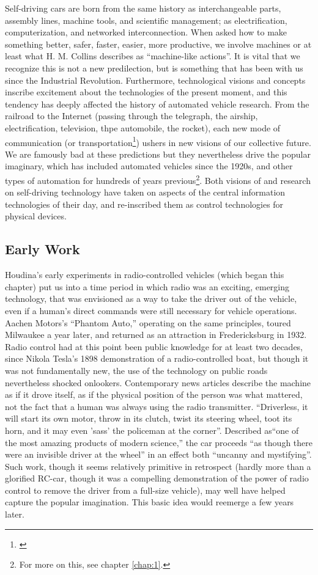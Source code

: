 Self-driving cars are born from the
same history as interchangeable parts, assembly lines, machine tools,
and scientific management; as electrification, computerization, and
networked interconnection. When asked how to make something better,
safer, faster, easier, more productive, we involve machines or at
least what H. M. Collins describes as ``machine-like actions''\cite{???}. It is
vital that we recognize this is not a new predilection, but is
something that has been with us since the Industrial Revolution.
Furthermore, technological visions and concepts inscribe excitement about the
technologies of the present moment, and this tendency has deeply
affected the history of automated vehicle research. From the railroad to the
Internet (passing through the telegraph, the airship, electrification,
television, thpe automobile, the rocket), each new mode of
communication (or transportation\footnote{\cite{???}}) ushers in new visions of our
collective future. We are famously bad at these predictions\cite{???} but they
nevertheless drive the popular imaginary, which has included automated
vehicles since the 1920s, and other types of automation for hundreds
of years previous\footnote{For more on this, see chapter
  \ref{chap:1}.}. Both visions of and research on self-driving
technology have taken on aspects of the central information
technologies of their day, and re-inscribed them as control
technologies for physical devices.

\subsection{Early Work}

Houdina's early experiments in radio-controlled vehicles (which began
this chapter) put us into a time period in which radio was an
exciting, emerging technology, that was envisioned as a way to take
the driver out of the vehicle, even if a human's direct commands were
still necessary for vehicle operations. Aachen Motors's ``Phantom
Auto,'' operating on the same principles, toured Milwaukee a year
later,\cite{???} and returned as an attraction in Fredericksburg in 1932\cite{???}.
Radio control had at this point been public knowledge for at least two
decades, since Nikola Tesla's 1898 demonstration of a radio-controlled
boat,\cite{???} but though it was not fundamentally new, the use of the
technology on public roads nevertheless shocked onlookers.
Contemporary news articles describe the machine as if it drove itself,
as if the physical position of the person was what mattered, not the
fact that a human was always using the radio transmitter. ``Driverless,
it will start its own motor, throw in its clutch, twist its steering
wheel, toot its horn, and it may even 'sass' the policeman at the
corner''\cite{???}. Described as``one of the most amazing products of
modern science,'' the 
car proceeds ``as though there were an invisible driver at the wheel''
in an effect both ``uncanny and mystifying''\cite{???}. Such work,
though it seems relatively primitive in retrospect (hardly more than a
glorified RC-car, though it was a compelling demonstration of the
power of radio control to remove the driver from a full-size vehicle), may well have
helped capture the popular imagination. This basic idea would reemerge
a few years later.

